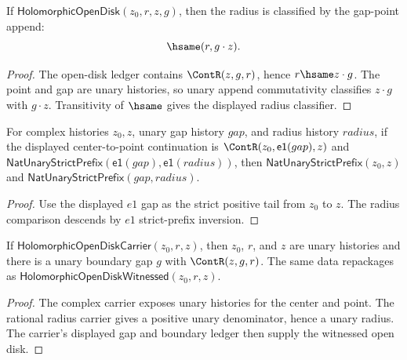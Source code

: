 \begin{theorem}
\label{thm:holomorphic-open-disk-gap-point-comm}
If $\mathsf{HolomorphicOpenDisk}(z_0,r,z,g)$, then the radius is classified by
the gap-point append:
$$
\hsame(r,g\cdot z).
$$
\end{theorem}
\begin{proof}
The open-disk ledger contains $\ContR(z,g,r)$, hence $r\hsame z\cdot g$.
The point and gap are unary histories, so unary append commutativity classifies
$z\cdot g$ with $g\cdot z$. Transitivity of $\hsame$ gives the displayed
radius classifier.
\end{proof}

\begin{theorem}
\label{thm:holo-open-disk-e1-gap-radius-inversion}
For complex histories $z_0,z$, unary gap history $gap$, and radius history
$radius$, if the displayed center-to-point continuation is
$\ContR(z_0,\mathsf{e1}(gap),z)$ and
$\mathsf{NatUnaryStrictPrefix}(\mathsf{e1}(gap),\mathsf{e1}(radius))$, then
$\mathsf{NatUnaryStrictPrefix}(z_0,z)$ and
$\mathsf{NatUnaryStrictPrefix}(gap,radius)$.
\end{theorem}
\begin{proof}
Use the displayed $e1$ gap as the strict positive tail from $z_0$ to $z$.
The radius comparison descends by $e1$ strict-prefix inversion.
\end{proof}

\begin{theorem}
\label{thm:holo-open-disk-carrier-witnessed-components}
If \(\mathsf{HolomorphicOpenDiskCarrier}(z_0,r,z)\), then \(z_0\), \(r\), and
\(z\) are unary histories and there is a unary boundary gap \(g\) with
\(\ContR(z,g,r)\). The same data repackages as
\(\mathsf{HolomorphicOpenDiskWitnessed}(z_0,r,z)\).
\end{theorem}
\begin{proof}
The complex carrier exposes unary histories for the center and point. The
rational radius carrier gives a positive unary denominator, hence a unary
radius. The carrier's displayed gap and boundary ledger then supply the
witnessed open disk.
\end{proof}

